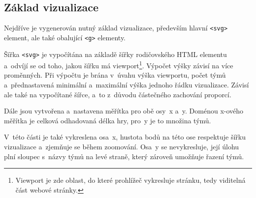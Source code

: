 \documentclass[
  digital, %
  oneside, %
  table,   %
  nolof,     %
  nolot,     %
  nocover
]{fithesis3}
\begin{document}

\subsection{Základ vizualizace}
Nejdříve je vygenerován nutný základ vizualizace, především hlavní \verb|<svg>| element, ale také obalující \verb|<g>| elementy.\par
Šířka \verb|<svg>| je vypočítána na základě šířky rodičovského HTML elementu a~odvíjí se od toho, jakou šířku má viewport\footnote{Viewport je zde oblast, do které prohlížeč vykresluje stránku, tedy viditelná část webové stránky.}. Výpočet výšky závisí na více proměnných. Při výpočtu je brána v~úvahu výška viewportu, počet týmů a~přednastavená minimální a~maximální výška jednoho řádku vizualizace. Závisí ale také na vypočítané šířce, a~to z~důvodu částečného zachování proporcí.\par
Dále jsou vytvořena a~nastavena měřítka pro obě osy~x a~y. Doménou x-ového měřítka je celková odhadovaná délka hry, pro~y je to množina týmů.\par
V~této části je také vykreslena osa~x, hustota bodů na této ose respektuje šířku vizualizace a~zjemňuje se během zoomování. Osa~y se nevykresluje, její úlohu plní sloupec s~názvy týmů na levé straně, který zároveň umožňuje řazení týmů.
\end{document}
